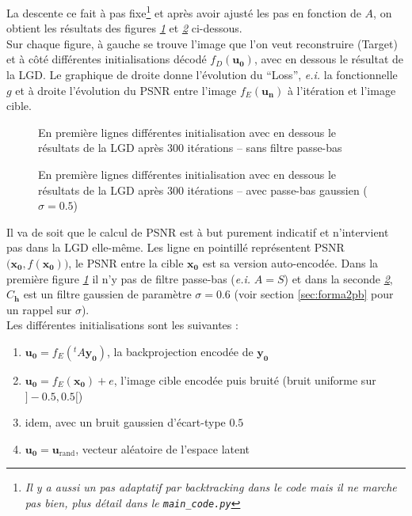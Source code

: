 \documentclass[hidelinks, french]{article} %
\newcommand{\ei}{\textit{e.i. }}
\renewcommand{\bf}[1]{\boldsymbol{#1}}
\theoremstyle{enonce}
\theoremstyle{special}
\theoremstyle{rq}
\theoremstyle{exo}
\theoremstyle{demo}
\begin{document}
La descente ce fait à pas fixe\footnote{\emph{Il y a aussi un pas adaptatif par backtracking dans le code mais il ne marche pas bien, plus détail dans le \texttt{main\_code.py}}} et après avoir ajusté les pas en fonction de $A$, on obtient les résultats des figures \textit{\ref{fig:LGDinits}} et \textit{\ref{fig:LGDinitg}} ci-dessous.
\\
Sur chaque figure, à gauche se trouve l'image que l'on veut reconstruire (Target) et à côté différentes initialisations décodé $f_D(\bf{u_0})$, avec en dessous le résultat de la LGD.
Le graphique de droite donne l'évolution du ``Loss'', \ei la fonctionnelle $g$ et à droite l'évolution du PSNR entre l'image $f_E(\bf{u_n})$ à l'itération et l'image cible.
\begin{figure}[H]\centering
	
    \caption{En première lignes différentes initialisation avec en dessous le résultats de la LGD après 300 itérations -- sans filtre passe-bas}
    \label{fig:LGDinits}
\end{figure}

\begin{figure}[H]\centering
    
    \caption{En première lignes différentes initialisation avec en dessous le résultats de la LGD après 300 itérations --  avec passe-bas gaussien ($\sigma=0.5$)}
    \label{fig:LGDinitg}
\end{figure}

Il va de soit que le calcul de PSNR est à but purement indicatif et n'intervient pas dans la LGD elle-même. Les ligne en pointillé représentent PSNR$\big(\bf{x_0},f(\bf{x_0})\big)$, le PSNR entre la cible $\bf{x_0}$ est sa version auto-encodée.
Dans la première figure \textit{\ref{fig:LGDinits}} il n'y pas de filtre passe-bas (\ei $A=S$) et dans la seconde \textit{\ref{fig:LGDinitg}}, $C_{\bf{h}}$ est un filtre gaussien de paramètre $\sigma=0.6$ (voir section \ref{sec:forma2pb} pour un rappel sur $\sigma$).
\\
Les différentes initialisations sont les suivantes :
\begin{enumerate}[label=(\arabic*)]
    \item $\bf{u_0}=f_E(^tA\bf{y_0})$, la backprojection encodée de $\bf{y_0}$
    \item $\bf{u_0}=f_E(\bf{x_0})+e$, l'image cible encodée puis bruité (bruit uniforme sur $]-0.5,0.5[$)
    \item idem, avec un bruit gaussien d'écart-type $0.5$
    \item $\bf{u_0}=\bf{u}_{\text{rand}}$,  vecteur aléatoire de l'espace latent
\end{enumerate}
\end{document}
